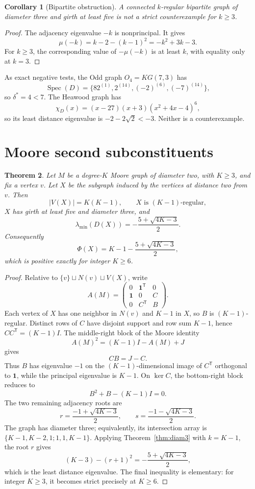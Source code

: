 \documentclass[11pt,reqno]{amsart}
\newcommand{\one}{\mathbf 1}
\newcommand{\Spec}{\operatorname{Spec}}
\newcommand{\PhiScore}{\Phi}
\theoremstyle{plain}
\newtheorem{theorem}{Theorem}[section]
\newtheorem{corollary}[theorem]{Corollary}
\theoremstyle{definition}
\theoremstyle{remark}
\begin{document}
\begin{corollary}[Bipartite obstruction]
A connected $k$-regular bipartite graph of diameter three and girth at least
five is not a strict counterexample for $k\ge3$.
\end{corollary}

\begin{proof}
The adjacency eigenvalue $-k$ is nonprincipal.  It gives
\[
 \mu(-k)=k-2-(k-1)^2=-k^2+3k-3.
\]
For $k\ge3$, the corresponding value of $-\mu(-k)$ is at least $k$, with
equality only at $k=3$.
\end{proof}

As exact negative tests, the Odd graph $O_4=KG(7,3)$ has
\[
 \Spec(D)=\{82^{(1)},2^{(14)},(-2)^{(6)},(-7)^{(14)}\},
\]
so $\delta^*=4<7$.  The Heawood graph has
\[
 \chi_D(x)=(x-27)(x+3)(x^2+4x-4)^6,
\]
so its least distance eigenvalue is $-2-2\sqrt2< -3$.  Neither is a
counterexample.

\section{Moore second subconstituents}\label{sec:subconstituent}

\begin{theorem}\label{thm:second-sub}
Let $M$ be a degree-$K$ Moore graph of diameter two, with $K\ge3$, and fix a
vertex $v$.  Let $X$ be the subgraph induced by the vertices at distance two
from $v$.  Then
\[
 |V(X)|=K(K-1),\qquad X\text{ is }(K-1)\text{-regular},
\]
$X$ has girth at least five and diameter three, and
\[
 \lambda_{\min}(D(X))=-\frac{5+\sqrt{4K-3}}2.
\]
Consequently
\[
 \PhiScore(X)=K-1-\frac{5+\sqrt{4K-3}}2,
\]
which is positive exactly for integer $K\ge6$.
\end{theorem}

\begin{proof}
Relative to $\{v\}\sqcup N(v)\sqcup V(X)$, write
\[
 A(M)=
 \begin{pmatrix}
 0&\one^{\mathsf T}&0\\
 \one&0&C\\
 0&C^{\mathsf T}&B
 \end{pmatrix}.
\]
Each vertex of $X$ has one neighbor in $N(v)$ and $K-1$ in $X$, so $B$ is
$(K-1)$-regular.  Distinct rows of $C$ have disjoint support and row sum
$K-1$, hence $CC^{\mathsf T}=(K-1)I$.  The middle-right block of the Moore
identity
\[
 A(M)^2=(K-1)I-A(M)+J
\]
gives
\[
 CB=J-C.
\]
Thus $B$ has eigenvalue $-1$ on the $(K-1)$-dimensional image of
$C^{\mathsf T}$ orthogonal to $\one$, while the principal eigenvalue is
$K-1$.  On $\ker C$, the bottom-right block reduces to
\[
 B^2+B-(K-1)I=0.
\]
The two remaining adjacency roots are
\[
 r=\frac{-1+\sqrt{4K-3}}2,
 \qquad
 s=\frac{-1-\sqrt{4K-3}}2.
\]
The graph has diameter three; equivalently, its intersection array is
$\{K-1,K-2,1;1,1,K-1\}$.  Applying Theorem~\ref{thm:diam3} with
$k=K-1$, the root $r$ gives
\[
 (K-3)-(r+1)^2=-\frac{5+\sqrt{4K-3}}2,
\]
which is the least distance eigenvalue.  The final inequality is elementary:
for integer $K\ge3$, it becomes strict precisely at $K\ge6$.
\end{proof}
\end{document}
